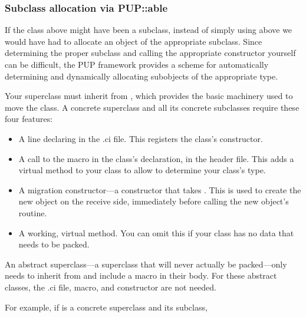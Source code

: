 \subsubsection{Subclass allocation via PUP::able}

\label{sec:pup::able}
If the class  above might have been a subclass, instead of
simply using  above we would have had to allocate 
an object of the appropriate subclass.  Since determining the
proper subclass and calling the appropriate constructor yourself can be 
difficult, the PUP framework provides a scheme for automatically
determining and dynamically allocating subobjects of the appropriate type.

Your superclass must inherit from , which provides 
the basic machinery used to move the class.  
A concrete superclass and all its concrete subclasses require these
four features:

\begin{itemize}
\item A line declaring  in the .ci file.
This registers the class's constructor.

\item A call to the macro  in the
class's declaration, in the header file.  This adds a virtual 
method to your class to allow  to determine your class's type.

\item A migration constructor---a constructor that takes .
This is used to create the new object on the receive side, immediately
before calling the new object's  routine.

\item A working, virtual  method.  You can omit this if your
class has no data that needs to be packed.
\end{itemize}

An abstract superclass---a superclass that will never actually be 
packed---only needs to inherit from  and include a 
 macro in their body.  For
these abstract classes, the 
.ci file,  macro, and constructor are not needed.

For example, if  is a concrete superclass and  its
subclass,

